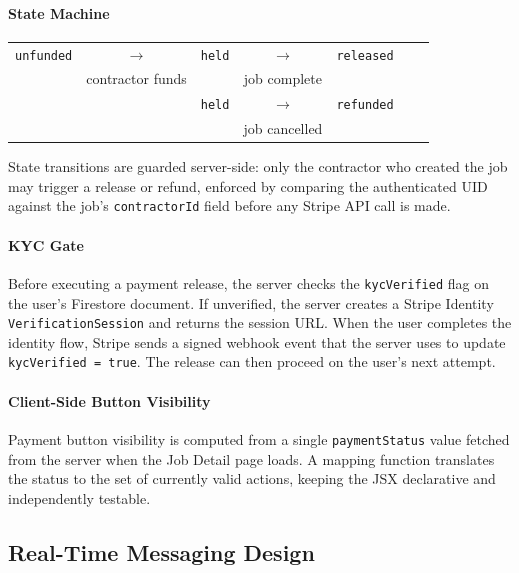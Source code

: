 \documentclass[11pt]{article}
\begin{document}
\paragraph{State Machine}
\begin{center}
\begin{tabular}{@{}ccccccc@{}}
\texttt{unfunded} & $\longrightarrow$ & \texttt{held} & $\longrightarrow$ & \texttt{released} \\
 & \footnotesize{contractor funds} & & \footnotesize{job complete} & \\[8pt]
 & & \texttt{held} & $\longrightarrow$ & \texttt{refunded} \\
 & & & \footnotesize{job cancelled} & \\
\end{tabular}
\end{center}

State transitions are guarded server-side: only the contractor who created the job
may trigger a release or refund, enforced by comparing the authenticated UID against
the job's \texttt{contractorId} field before any Stripe API call is made.

\paragraph{KYC Gate}
Before executing a payment release, the server checks the \texttt{kycVerified} flag
on the user's Firestore document. If unverified, the server creates a Stripe Identity
\texttt{VerificationSession} and returns the session URL. When the user completes the
identity flow, Stripe sends a signed webhook event that the server uses to update
\texttt{kycVerified = true}. The release can then proceed on the user's next attempt.

\paragraph{Client-Side Button Visibility}

Payment button visibility is computed from a single \texttt{paymentStatus} value
fetched from the server when the Job Detail page loads. A mapping function translates
the status to the set of currently valid actions, keeping the JSX declarative and
independently testable.

\subsection{Real-Time Messaging Design}
\end{document}
